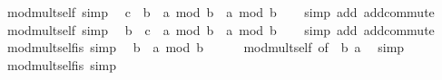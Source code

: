 \begin{isabellebody}
\endisatagproof
{\isafoldproof}%
%
\isadelimproof
\isanewline
%
\endisadelimproof
\isanewline
{}\isamarkupfalse%
\ mod{\isacharunderscore}{\kern0pt}mult{\isacharunderscore}{\kern0pt}self{}\ {\isacharbrackleft}{\kern0pt}simp{\isacharbrackright}{\kern0pt}{\isacharcolon}{\kern0pt}\isanewline
\ \ {\isachardoublequoteopen}{\isacharparenleft}{\kern0pt}c\ {\isacharasterisk}{\kern0pt}\ b\ {\isacharplus}{\kern0pt}\ a{\isacharparenright}{\kern0pt}\ mod\ b\ {\isacharequal}{\kern0pt}\ a\ mod\ b{\isachardoublequoteclose}\isanewline
%
\isadelimproof
\ \ %
\endisadelimproof
%
\isatagproof
{}\isamarkupfalse%
\ {\isacharparenleft}{\kern0pt}simp\ add{\isacharcolon}{\kern0pt}\ add{\isachardot}{\kern0pt}commute{\isacharparenright}{\kern0pt}%
\endisatagproof
{\isafoldproof}%
%
\isadelimproof
\isanewline
%
\endisadelimproof
\isanewline
{}\isamarkupfalse%
\ mod{\isacharunderscore}{\kern0pt}mult{\isacharunderscore}{\kern0pt}self{}\ {\isacharbrackleft}{\kern0pt}simp{\isacharbrackright}{\kern0pt}{\isacharcolon}{\kern0pt}\isanewline
\ \ {\isachardoublequoteopen}{\isacharparenleft}{\kern0pt}b\ {\isacharasterisk}{\kern0pt}\ c\ {\isacharplus}{\kern0pt}\ a{\isacharparenright}{\kern0pt}\ mod\ b\ {\isacharequal}{\kern0pt}\ a\ mod\ b{\isachardoublequoteclose}\isanewline
%
\isadelimproof
\ \ %
\endisadelimproof
%
\isatagproof
{}\isamarkupfalse%
\ {\isacharparenleft}{\kern0pt}simp\ add{\isacharcolon}{\kern0pt}\ add{\isachardot}{\kern0pt}commute{\isacharparenright}{\kern0pt}%
\endisatagproof
{\isafoldproof}%
%
\isadelimproof
\isanewline
%
\endisadelimproof
\isanewline
{}\isamarkupfalse%
\ mod{\isacharunderscore}{\kern0pt}mult{\isacharunderscore}{\kern0pt}self{}{\isacharunderscore}{\kern0pt}is{\isacharunderscore}{\kern0pt}{}\ {\isacharbrackleft}{\kern0pt}simp{\isacharbrackright}{\kern0pt}{\isacharcolon}{\kern0pt}\isanewline
\ \ {\isachardoublequoteopen}b\ {\isacharasterisk}{\kern0pt}\ a\ mod\ b\ {\isacharequal}{\kern0pt}\ {}{\isachardoublequoteclose}\isanewline
%
\isadelimproof
\ \ %
\endisadelimproof
%
\isatagproof
{}\isamarkupfalse%
\ mod{\isacharunderscore}{\kern0pt}mult{\isacharunderscore}{\kern0pt}self{}\ {\isacharbrackleft}{\kern0pt}of\ {}\ b\ a{\isacharbrackright}{\kern0pt}\ \isamarkupfalse%
\ simp%
\endisatagproof
{\isafoldproof}%
%
\isadelimproof
\isanewline
%
\endisadelimproof
\isanewline
{}\isamarkupfalse%
\ mod{\isacharunderscore}{\kern0pt}mult{\isacharunderscore}{\kern0pt}self{}{\isacharunderscore}{\kern0pt}is{\isacharunderscore}{\kern0pt}{}\ {\isacharbrackleft}{\kern0pt}simp{\isacharbrackright}{\kern0pt}{\isacharcolon}{\kern0pt}\isanewline

\end{isabellebody}

